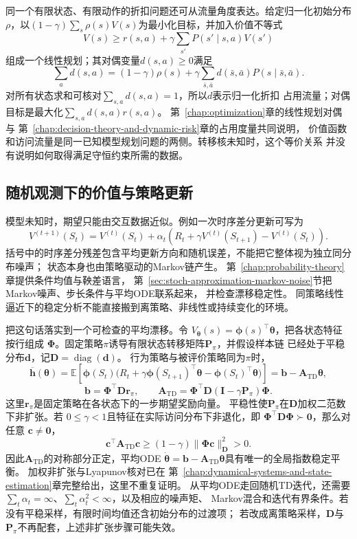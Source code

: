 同一个有限状态、有限动作的折扣问题还可从流量角度表达。给定归一化初始分布
$\rho$，以$(1-\gamma)\sum_s\rho(s)V(s)$为最小化目标，并加入价值不等式
\[
  V(s)
  \geq
  r(s,a)
  +
  \gamma\sum_{s'}P(s'\mid s,a)V(s')
\]
组成一个线性规划；其对偶变量$d(s,a)\geq0$满足
\begin{equation}
  \sum_a d(s,a)
  =
  (1-\gamma)\rho(s)
  +
  \gamma
  \sum_{\bar s,\bar a}
  d(\bar s,\bar a)P(s\mid\bar s,\bar a).
  \label{eq:future-discounted-occupancy-flow}
\end{equation}
对所有状态求和可核对$\sum_{s,a}d(s,a)=1$，所以$d$表示归一化折扣
占用流量；对偶目标是最大化$\sum_{s,a}d(s,a)r(s,a)$。
第~\ref{chap:optimization}章的线性规划对偶与
第~\ref{chap:decision-theory-and-dynamic-risk}章的占用度量共同说明，
价值函数和访问流量是同一已知模型规划问题的两侧。转移核未知时，这个等价关系
并没有说明如何取得满足守恒约束所需的数据。

\subsection{随机观测下的价值与策略更新}
\label{sec:future-random-observations-value-policy-updates}

模型未知时，期望只能由交互数据近似。例如一次时序差分更新可写为
\[
  V^{(t+1)}(S_t)
  =
  V^{(t)}(S_t)
  +
  \alpha_t
  \left(
    R_t+\gamma V^{(t)}(S_{t+1})-V^{(t)}(S_t)
  \right).
\]
括号中的时序差分残差包含平均更新方向和随机误差，不能把它整体视为独立同分布噪声；
状态本身也由策略驱动的Markov链产生。
第~\ref{chap:probability-theory}章提供条件均值与鞅差语言，
第~\ref{sec:stoch-approximation-markov-noise}节把Markov噪声、步长条件与平均ODE联系起来，
并检查漂移稳定性。
同策略线性逼近下的稳定分析不能直接搬到离策略、非线性或持续变化的环境。

把这句话落实到一个可检查的平均漂移。令
\(V_{\bm\theta}(s)=\bm\phi(s)^{\top}\bm\theta\)，把各状态特征按行组成
\(\bm\Phi\)。固定策略\(\pi\)诱导有限状态转移矩阵\(\bm P_\pi\)，并假设样本链
已经处于平稳分布\(\bm d\)，记\(\bm D=\operatorname{diag}(\bm d)\)。
行为策略与被评价策略同为\(\pi\)时，
\[
  \overline{\bm h}(\bm\theta)
  =
  \mathbb{E}\!\left[
    \bm\phi(S_t)
    \bigl(
      R_t+\gamma\bm\phi(S_{t+1})^{\top}\bm\theta
      -\bm\phi(S_t)^{\top}\bm\theta
    \bigr)
  \right]
  =
  \bm b-\bm A_{\mathrm{TD}}\bm\theta,
\]
\[
  \bm b=\bm\Phi^{\top}\bm D\bm r_\pi,
  \qquad
  \bm A_{\mathrm{TD}}
  =
  \bm\Phi^{\top}\bm D
  (\bm I-\gamma\bm P_\pi)\bm\Phi.
\]
这里\(\bm r_\pi\)是固定策略在各状态下的一步期望奖励向量。
平稳性使\(\bm P_\pi\)在\(\bm D\)加权二范数下非扩张。若
\(0\leq\gamma<1\)且特征在实际访问分布下非退化，即
\(\bm\Phi^{\top}\bm D\bm\Phi\succ\bm0\)，那么对任意
\(\bm c\neq\bm0\)，
\[
  \bm c^{\top}\bm A_{\mathrm{TD}}\bm c
  \geq
  (1-\gamma)
  \lVert\bm\Phi\bm c\rVert_{\bm D}^{2}
  >
  0.
\]
因此\(\bm A_{\mathrm{TD}}\)的对称部分正定，平均ODE
\(\dot{\bm\theta}=\bm b-\bm A_{\mathrm{TD}}\bm\theta\)具有唯一的全局指数稳定平衡。
加权非扩张与Lyapunov核对已在
第~\ref{chap:dynamical-systems-and-state-estimation}章完整给出，这里不重复证明。
从平均ODE走回随机TD迭代，还需要
\(\sum_t\alpha_t=\infty\)、\(\sum_t\alpha_t^2<\infty\)，以及相应的噪声矩、
Markov混合和迭代有界条件。若没有平稳采样，有限时间均值还含初始分布的过渡项；
若改成离策略采样，\(\bm D\)与\(\bm P_\pi\)不再配套，上述非扩张步骤可能失效。

